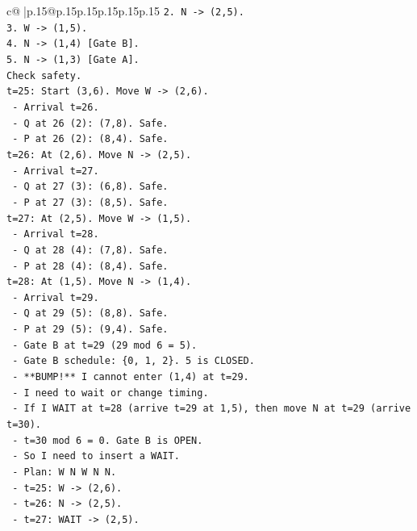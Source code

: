 \documentclass{article}
\begin{document}
{\begin{supertabular}{c@{$\;$}|p{.15\linewidth}@{}p{.15\linewidth}p{.15\linewidth}p{.15\linewidth}p{.15\linewidth}p{.15\linewidth}}
{{{\texttt{2. N {-}> (2,5).} \\
\texttt{3. W {-}> (1,5).} \\
\texttt{4. N {-}> (1,4) {[}Gate B{]}.} \\
\texttt{5. N {-}> (1,3) {[}Gate A{]}.} \\
\texttt{Check safety.} \\
\texttt{t=25: Start (3,6). Move W {-}> (2,6).} \\
\texttt{  {-} Arrival t=26.} \\
\texttt{  {-} Q at 26 (2): (7,8). Safe.} \\
\texttt{  {-} P at 26 (2): (8,4). Safe.} \\
\texttt{t=26: At (2,6). Move N {-}> (2,5).} \\
\texttt{  {-} Arrival t=27.} \\
\texttt{  {-} Q at 27 (3): (6,8). Safe.} \\
\texttt{  {-} P at 27 (3): (8,5). Safe.} \\
\texttt{t=27: At (2,5). Move W {-}> (1,5).} \\
\texttt{  {-} Arrival t=28.} \\
\texttt{  {-} Q at 28 (4): (7,8). Safe.} \\
\texttt{  {-} P at 28 (4): (8,4). Safe.} \\
\texttt{t=28: At (1,5). Move N {-}> (1,4).} \\
\texttt{  {-} Arrival t=29.} \\
\texttt{  {-} Q at 29 (5): (8,8). Safe.} \\
\texttt{  {-} P at 29 (5): (9,4). Safe.} \\
\texttt{  {-} Gate B at t=29 (29 mod 6 = 5).} \\
\texttt{  {-} Gate B schedule: \{0, 1, 2\}. 5 is CLOSED.} \\
\texttt{  {-} **BUMP!** I cannot enter (1,4) at t=29.} \\
\texttt{  {-} I need to wait or change timing.} \\
\texttt{  {-} If I WAIT at t=28 (arrive t=29 at 1,5), then move N at t=29 (arrive t=30).} \\
\texttt{  {-} t=30 mod 6 = 0. Gate B is OPEN.} \\
\texttt{  {-} So I need to insert a WAIT.} \\
\texttt{  {-} Plan: W N W N N.} \\
\texttt{  {-} t=25: W {-}> (2,6).} \\
\texttt{  {-} t=26: N {-}> (2,5).} \\
\texttt{  {-} t=27: WAIT {-}> (2,5).} \\
}}}
\end{supertabular}}
\end{document}

